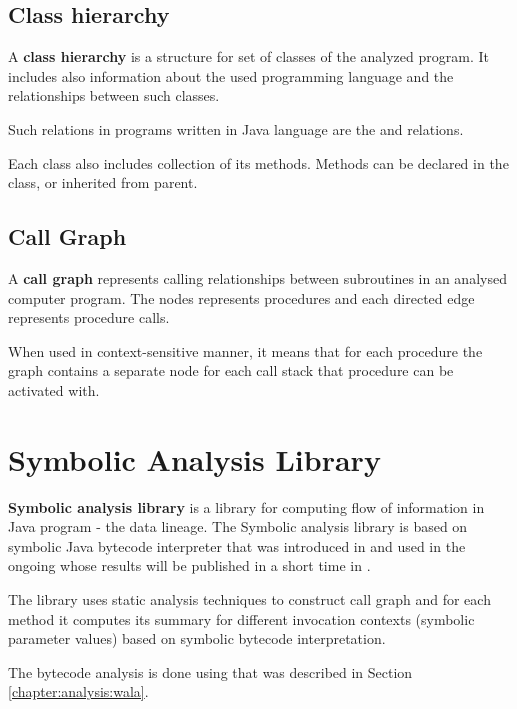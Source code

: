 \subsection{Class hierarchy}

A \textbf{class hierarchy} is a structure for set of classes
of the analyzed program. It includes also information about the used
programming language and the relationships between such classes.

Such relations in programs written in Java language are the  and 
relations.

Each class also includes collection of its methods. Methods can be declared in the
class, or inherited from parent.



\subsection{Call Graph}

A \textbf{call graph} represents calling relationships between subroutines
in an analysed computer program. The nodes represents procedures and each
directed edge represents procedure calls.

When used in context-sensitive manner, it means that for each procedure 
the graph contains a separate node for each call stack that procedure can be
activated with.




\section{Symbolic Analysis Library \label{chapter:analysis:symbolicAnalysisLibrary}}

\textbf{Symbolic analysis library} is a library for computing flow of information
in Java program - the data lineage.
The Symbolic analysis library is based on symbolic Java bytecode interpreter
that was introduced in \citet{ParizekHybridAnalysis}
and used in the ongoing whose results will be published
in a short time in \citet{ParizekBUBEN}.

The library uses static analysis techniques to construct call graph and
for each method it computes its summary for different invocation contexts (symbolic parameter values)
based on symbolic bytecode interpretation.

The bytecode analysis is done using \citet{WalaFramework}
that was described in Section \ref{chapter:analysis:wala}.


